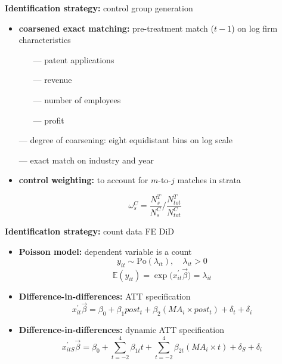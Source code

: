 \documentclass{beamer} %
\begin{document}
\begin{frame}{\textbf{Identification strategy:} control group generation}
\begin{itemize}
	\item \textbf{coarsened exact matching:} pre-treatment match ($t-1$) on log firm characteristics
	\vspace{.1cm}
	\begin{itemize}
		\item[---] patent applications
		\item[---] revenue
		\item[---] number of employees
		\item[---] profit
	\end{itemize}
	\item[---] degree of coarsening: eight equidistant bins on log scale \hfill \hyperlink{cutpoints}{}
	\item[---] exact match on industry and year
	\vspace{.5cm}
	\item \textbf{control weighting:} to account for $m$-to-$j$ matches in strata
\end{itemize}
\vspace{.3cm}
\begin{equation*}
\omega_{s}^{C} = \frac{N_{s}^{T}}{N_{s}^{C}} \bigg / \frac{N_{tot}^{T}}{N_{tot}^{C}}
\end{equation*}
\end{frame}

\begin{frame}{\textbf{Identification strategy:} count data FE DiD}
	\begin{itemize}
		\item \textbf{Poisson model:} dependent variable is a count
		\begin{equation*}
		    y_{it} \sim \text{Po}(\lambda_{it}),\quad \lambda_{it} > 0
		\end{equation*}
		\begin{equation*}
		    \mathbb{E}(y_{it})=\exp{\big(x_{it}^{\prime}\vec{\beta}\big)}=\lambda_{it}
		\end{equation*}
		\item \textbf{Difference-in-differences:} ATT specification
		\begin{equation*}
		    x_{it}^{\prime}\vec{\beta}=\beta_{0} + \beta_{1} post_{t} + \beta_{2} (MA_{i}\times post_{t}) + \delta_{t} + \delta_{i}
		\end{equation*}
		\item \textbf{Difference-in-differences:} dynamic ATT specification
		\begin{equation*}
		    x_{itS}^{\prime}\vec{\beta} = \beta_{0} + \sum_{t=-2}^{4}{\beta_{1t} t} + \sum_{t=-2}^{4}{\beta_{2t}(MA_{i}\times t)} + \delta_{S} + \delta_{i}
		\end{equation*}
	\end{itemize}
\end{frame}
\end{document}
